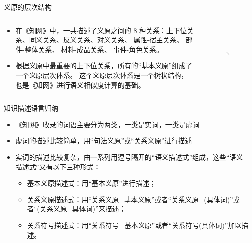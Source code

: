 \documentclass{beamer}
\begin{document}
    \begin{frame}{义原的层次结构}
      \begin{columns}
      \begin{column}[t]{0.6\textwidth}
        \begin{itemize}
        \item 在《知网》中，一共描述了义原之间的 8 种关系：上下位关系、同义关系、反义关系、对义关系、 属性-宿主关系、 部件-整体关系、 材料-成品关系、 事件-角色关系。
        \item 根据义原中最重要的上下位关系，所有的“基本义原”组成了一个义原层次体系。
这个义原层次体系是一个树状结构， 也是《知网》进行语义相似度计算的基础。
      \end{itemize}
      \end{column}

      \begin{column}[t]{0.4\textwidth}
        \begin{figure}
      \includegraphics[width=1.6in,height=1.2in]{hownet2.png}
      \end{figure}
      \end{column}

      \end{columns}
      
    \end{frame}

    \begin{frame}{知识描述语言归纳}
      \begin{itemize}
        \item 《知网》收录的词语主要分为两类，一类是实词，一类是虚词
        \item 虚词的描述比较简单，用“句法义原”或“关系义原”进行描述
        \item 实词的描述比较复杂，由一系列用逗号隔开的“语义描述式”组成，这些“语义描述式”又有以下三种形式：
          \begin{itemize}
            \item 基本义原描述式：用“基本义原”进行描述；
            \item 关系义原描述式：用“关系义原=基本义原”或者“关系义原=(具体词)”或者“(关系义原=具体词)”来描述；
            \item 关系符号描述式：用“关系符号 \ 基本义原”或者“关系符号(具体词)”加以描述。
          \end{itemize}
      \end{itemize}
    \end{frame}
\end{document}
